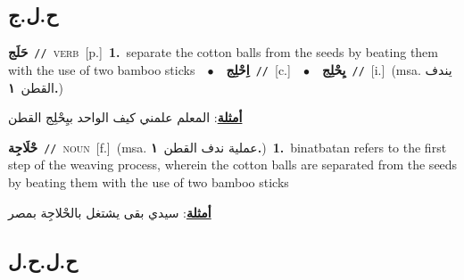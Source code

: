 \documentclass[10pt,a4paper,twoside]{article} %
\begin{document}
\begin{multicols}{2}
\vspace{-3mm}
\subsection*{\color{blue}\foreignlanguage{arabic}{ح.ل.ج}\color{blue}{}} 

{\setlength\topsep{0pt}\textbf{\foreignlanguage{arabic}{حَلَج}}\ {\color{gray}\texttt{//}\color{black}}\ \textsc{verb}\ [p.]\ \textbf{1.}~separate the cotton balls from the seeds by beating them with the use of two bamboo sticks\ \ $\bullet$\ \ \setlength\topsep{0pt}\textbf{\foreignlanguage{arabic}{اِحْلِج}}\ {\color{gray}\texttt{//}\color{black}}\ [c.]\ \ $\bullet$\ \ \setlength\topsep{0pt}\textbf{\foreignlanguage{arabic}{يِحْلِج}}\ {\color{gray}\texttt{//}\color{black}}\ [i.]\ \color{gray}(msa. \foreignlanguage{arabic}{يندف القطن}~\foreignlanguage{arabic}{\textbf{١.}})\color{black}\  \begin{flushright}\color{gray}\foreignlanguage{arabic}{\textbf{\underline{\foreignlanguage{arabic}{أمثلة}}}: المعلم علمني كيف الواحد بيِحْلِج القطن}\end{flushright}\color{black}} \vspace{2mm}

{\setlength\topsep{0pt}\textbf{\foreignlanguage{arabic}{حْلَاجِة}}\ {\color{gray}\texttt{//}\color{black}}\ \textsc{noun}\ [f.]\ \color{gray}(msa. \foreignlanguage{arabic}{عملية ندف القطن}~\foreignlanguage{arabic}{\textbf{١.}})\color{black}\ \textbf{1.}~binatbatan refers to the first step of the weaving process, wherein the cotton balls are separated from the seeds by beating them with the use of two bamboo sticks\  \begin{flushright}\color{gray}\foreignlanguage{arabic}{\textbf{\underline{\foreignlanguage{arabic}{أمثلة}}}: سيدي بقى يشتغل بالحْلاجِة بمصر}\end{flushright}\color{black}} \vspace{2mm}

\vspace{-3mm}
\subsection*{\color{blue}\foreignlanguage{arabic}{ح.ل.ح.ل}\color{blue}{}} 


\end{multicols}
\end{document}
